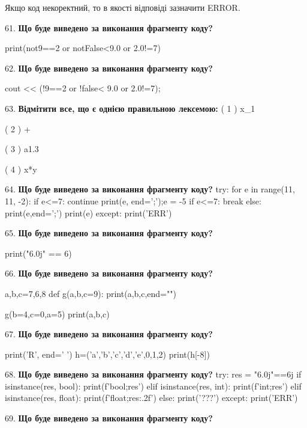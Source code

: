 \documentclass[11pt]{article}
\begin{document}
Якщо код некоректний, то в якості відповіді зазначити ERROR.


\par\vspace{5mm}
61. \textbf{Що буде виведено за виконання фрагменту коду?}

print(not9==2 or notFalse<9.0 or 2.0!=7)
\par\vspace{5mm}
62. \textbf{Що буде виведено за виконання фрагменту коду?}

cout << (!9==2 or !false< 9.0 or 2.0!=7);
\par\vspace{5mm}
63. %
\textbf{Відмітити все, що є однією правильною лексемою:}
( 1 ) x_1

( 2 ) +

( 3 ) a1.3

( 4 ) x*y
\par\vspace{5mm}
64. \textbf{Що буде виведено за виконання фрагменту коду?}
try:
    for e in range(11, 11, -2):
        if e<=7:
            continue
        print(e, end=';');e = -5
        if e<=7:
            break
    else:
        print(e,end=';')
    print(e)
except:
    print('ERR')
\par\vspace{5mm}
65. \textbf{Що буде виведено за виконання фрагменту коду?}

print("6.0j" == 6)
\par\vspace{5mm}
66. \textbf{Що буде виведено за виконання фрагменту коду?}

a,b,c=7,6,8
def g(a,b,c=9):
    print(a,b,c,end="")

g(b=4,c=0,a=5)
print(a,b,c)

\par\vspace{5mm}
67. \textbf{Що буде виведено за виконання фрагменту коду?}

print('R', end=' ')
h=('a','b','c','d','e',0,1,2)
print(h[-8])

\par\vspace{5mm}
68. \textbf{Що буде виведено за виконання фрагменту коду?}
try:
    res = "6.0j"==6j
    if isinstance(res, bool):
        print(f'bool;{res}')
    elif isinstance(res, int):
        print(f'int;{res}')
    elif isinstance(res, float):
        print(f'float;{res:.2f}')
    else:
        print('???')
except:
    print('ERR')
\par\vspace{5mm}
69. \textbf{Що буде виведено за виконання фрагменту коду?}
\end{document}
